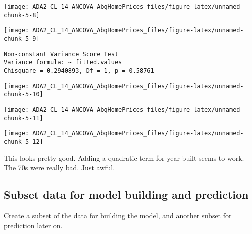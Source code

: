 \documentclass[
  12pt,
]{article}
\begin{document}
\begin{center}\texttt{[image: ADA2\_CL\_14\_ANCOVA\_AbqHomePrices\_files/figure-latex/unnamed-chunk-5-8]} \end{center}

\begin{center}\texttt{[image: ADA2\_CL\_14\_ANCOVA\_AbqHomePrices\_files/figure-latex/unnamed-chunk-5-9]} \end{center}

\begin{verbatim}
Non-constant Variance Score Test 
Variance formula: ~ fitted.values 
Chisquare = 0.2940893, Df = 1, p = 0.58761
\end{verbatim}

\begin{center}\texttt{[image: ADA2\_CL\_14\_ANCOVA\_AbqHomePrices\_files/figure-latex/unnamed-chunk-5-10]} \end{center}

\begin{center}\texttt{[image: ADA2\_CL\_14\_ANCOVA\_AbqHomePrices\_files/figure-latex/unnamed-chunk-5-11]} \end{center}

\begin{center}\texttt{[image: ADA2\_CL\_14\_ANCOVA\_AbqHomePrices\_files/figure-latex/unnamed-chunk-5-12]} \end{center}

This looks pretty good. Adding a quadratic term for year built seems to
work. The 70s were really bad. Just awful.

\hypertarget{subset-data-for-model-building-and-prediction}{%
\subsection{Subset data for model building and
prediction}\label{subset-data-for-model-building-and-prediction}}

Create a subset of the data for building the model, and another subset
for prediction later on.
\end{document}
